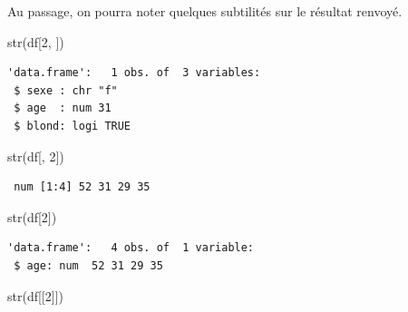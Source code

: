 \documentclass[
  letterpaper,
  DIV=11,
  numbers=noendperiod,
  oneside]{scrreprt}
\newenvironment{Shaded}{\begin{snugshade}}{\end{snugshade}}
\newcommand{\DecValTok}[1]{\textcolor[rgb]{0.68,0.00,0.00}{#1}}
\newcommand{\FunctionTok}[1]{\textcolor[rgb]{0.28,0.35,0.67}{#1}}
\newcommand{\NormalTok}[1]{\textcolor[rgb]{0.00,0.23,0.31}{#1}}
\begin{document}
\begin{tcolorbox}[enhanced jigsaw, colbacktitle=quarto-callout-note-color!10!white, opacityback=0, toprule=.15mm, colback=white, coltitle=black, bottomtitle=1mm, toptitle=1mm, titlerule=0mm, rightrule=.15mm, title=\textcolor{quarto-callout-note-color}{\faInfo}\hspace{0.5em}{Note}, breakable, bottomrule=.15mm, opacitybacktitle=0.6, arc=.35mm, left=2mm, leftrule=.75mm, colframe=quarto-callout-note-color-frame]

Au passage, on pourra noter quelques subtilités sur le résultat renvoyé.

\begin{Shaded}
\begin{Highlighting}[]
\FunctionTok{str}\NormalTok{(df[}\DecValTok{2}\NormalTok{, ])}
\end{Highlighting}
\end{Shaded}

\begin{verbatim}
'data.frame':   1 obs. of  3 variables:
 $ sexe : chr "f"
 $ age  : num 31
 $ blond: logi TRUE
\end{verbatim}

\begin{Shaded}
\begin{Highlighting}[]
\FunctionTok{str}\NormalTok{(df[, }\DecValTok{2}\NormalTok{])}
\end{Highlighting}
\end{Shaded}

\begin{verbatim}
 num [1:4] 52 31 29 35
\end{verbatim}

\begin{Shaded}
\begin{Highlighting}[]
\FunctionTok{str}\NormalTok{(df[}\DecValTok{2}\NormalTok{])}
\end{Highlighting}
\end{Shaded}

\begin{verbatim}
'data.frame':   4 obs. of  1 variable:
 $ age: num  52 31 29 35
\end{verbatim}

\begin{Shaded}
\begin{Highlighting}[]
\FunctionTok{str}\NormalTok{(df[[}\DecValTok{2}\NormalTok{]])}
\end{Highlighting}
\end{Shaded}


\end{tcolorbox}
\end{document}
